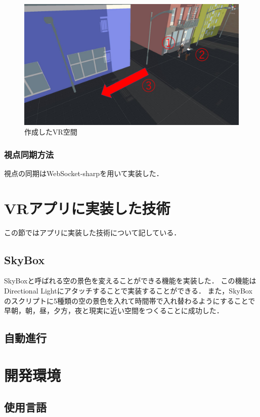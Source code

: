 \documentclass[12pt,a4j,titlepage]{ltjsarticle}
\begin{document}
\begin{figure}[h]
\begin{center}
\includegraphics[keepaspectratio, scale=0.5]{screenshot.pdf}
\end{center}
 \caption{作成したVR空間}
 \label{fig:screen}
\end{figure}
\subsubsection{視点同期方法}
視点の同期はWebSocket-sharpを用いて実装した．

\clearpage

\section{VRアプリに実装した技術}
この節ではアプリに実装した技術について記している．
\subsection{SkyBox}
SkyBoxと呼ばれる空の景色を変えることができる機能を実装した．
この機能はDirectional Lightにアタッチすることで実装することができる．
また，SkyBoxのスクリプトに5種類の空の景色を入れて時間帯で入れ替わるようにすることで早朝，朝，昼，夕方，夜と現実に近い空間をつくることに成功した．

\subsection{自動進行}

\clearpage

\section{開発環境}
\subsection{使用言語}
\end{document}
